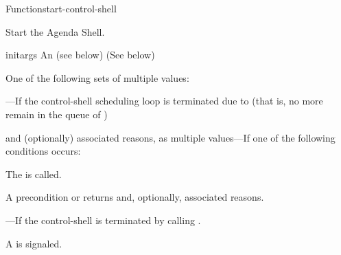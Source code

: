 \documentclass[10pt,twoside,english,pdftex]{article}
\begin{document}
\begin{functiondoc}{Function}{start-control-shell}%
  {
    }
%
%
%
%

\fnsyntax

\fnpurpose Start the Agenda Shell.

\fnpackage {}

\fnmodule {}

\fnargs
\begin{args}{initargs}
\arg[initargs] An  (see below)
\arg[results] (See below)
\end{args}

\fnreturns
One of the following sets of multiple values: 

\begin{tightitemize}
\item {}---If the control-shell scheduling loop is terminated
  due to  (that is, no more  remain
  in the queue of )
\item {} and (optionally) associated reasons, as multiple
  values---If one of the following conditions occurs:
\begin{tightitemize}
\item The   is
  called.
\item A precondition  or  
  returns  and, optionally, associated reasons.
\end{tightitemize}
\item {}---If the control-shell is terminated by
  calling .
\end{tightitemize}

\fnevents
{}%
%
%
%
%
%
A  is signaled.
 
\fnerrors
\threadsnotstarted


\end{functiondoc}
\end{document}
